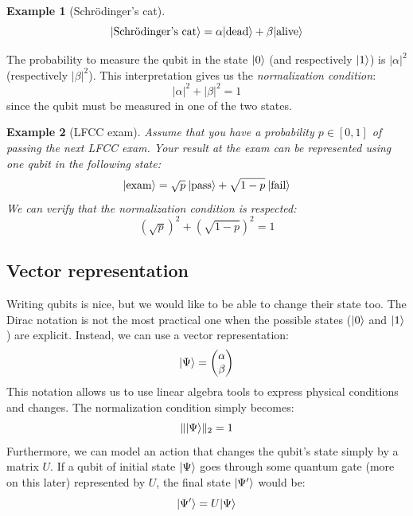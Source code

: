 \documentclass[12pt,a4paper]{article}
\theoremstyle{plain}
\newtheorem*{example}{Example}
\theoremstyle{definition}
\DeclarePairedDelimiter\ket{\lvert}{\rangle}
\begin{document}
\begin{example}[Schrödinger's cat]
    \begin{equation*}
        \ket{\textnormal{Schrödinger's cat}} = \alpha\ket{\textnormal{dead}} + \beta\ket{\textnormal{alive}}
    \end{equation*}
\end{example}

The probability to measure the qubit in the state $\ket{0}$ (and respectively $\ket{1}$) is $|\alpha|^2$ (respectively $|\beta|^2$). This interpretation gives us the \emph{normalization condition}:
\begin{equation*}
    |\alpha|^2+|\beta|^2=1
\end{equation*}
since the qubit must be measured in one of the two states.

\begin{example}[LFCC exam]
    Assume that you have a probability $p\in[0, 1]$ of passing the next LFCC exam. Your result at the exam can be represented using one qubit in the following state:
    \begin{equation*}
        \ket{\textnormal{exam}} = \sqrt{p} \: \ket{\textnormal{pass}}+\sqrt{1-p} \: \ket{\textnormal{fail}}
    \end{equation*}
    We can verify that the normalization condition is respected:
    \begin{equation*}
        (\sqrt{p})^2 + (\sqrt{1-p})^2 = 1
    \end{equation*}
\end{example}

\subsection{Vector representation}
Writing qubits is nice, but we would like to be able to change their state too. The Dirac notation is not the most practical one when the possible states ($\ket{0}$ and $\ket{1}$) are explicit. Instead, we can use a vector representation:
\begin{equation*}
    \ket{\Psi} = \begin{pmatrix}\alpha\\\beta\end{pmatrix}
\end{equation*}
This notation allows us to use linear algebra tools to express physical conditions and changes. The normalization condition simply becomes:
\begin{equation*}
    \|\ket{\Psi}\|_2 = 1
\end{equation*}
Furthermore, we can model an action that changes the qubit's state simply by a matrix $U$. If a qubit of initial state $\ket{\Psi}$ goes through some quantum gate (more on this later) represented by $U$, the final state $\ket{\Psi'}$ would be:
\begin{equation*}
    \ket{\Psi'} = U\ket{\Psi}
\end{equation*}
\end{document}

